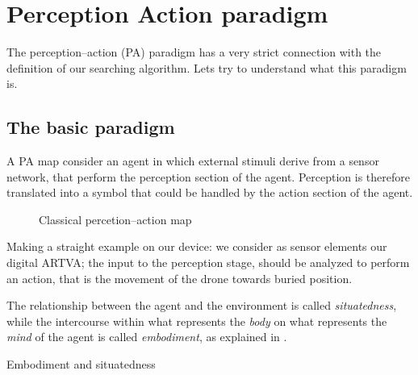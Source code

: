 \section{Perception Action paradigm}
The perception--action (PA) paradigm has a very strict connection with the definition of our searching algorithm. Lets try to understand what this paradigm is.

\subsection{The basic paradigm}
A PA map consider an agent in which external stimuli derive from a sensor network, that perform the perception section of the agent. Perception is therefore translated into a symbol that could be handled by the action section of the agent.
\begin{figure}[h]
\caption{Classical percetion--action map}
\centering
{}
\end{figure}

Making a straight example on our device: we consider as sensor elements our digital ARTVA; the input to the perception stage, should be analyzed to perform an action, that is the movement of the drone towards buried position.

The relationship between the agent and the environment is called \emph{situatedness}, while the intercourse within what represents the \emph{body} on what represents the \emph{mind} of the agent is called \emph{embodiment}, as explained in \citep{thedynamicsofactivecaterogicalperception}.
\begin{marginfigure}
\centering
{}
\caption{Embodiment and situatedness}
\end{marginfigure}

